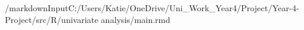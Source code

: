 /markdownInput{C:/Users/Katie/OneDrive/Uni_Work_Year4/Project/Year-4-Project/src/R/univariate analysis/main.rmd}